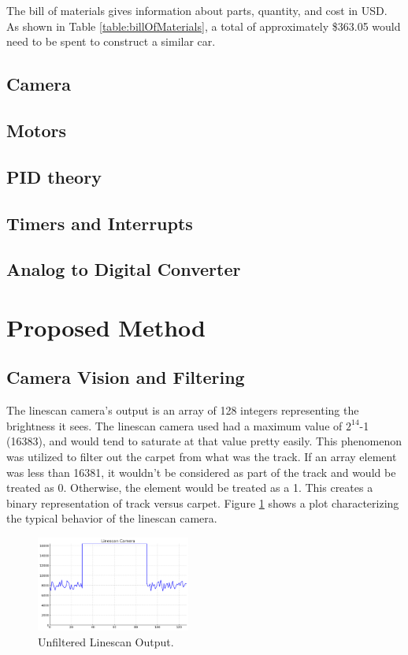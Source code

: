 \documentclass[conference]{IEEEtran}
\begin{document}
The bill of materials gives information about parts, quantity, and cost in USD. As shown in Table \ref{table:billOfMaterials}, a total of approximately \$363.05 would need to be spent to construct a similar car.

\subsection{Camera}

\subsection{Motors}

\subsection{PID theory}

\subsection{Timers and Interrupts}

\subsection{Analog to Digital Converter}

\section{Proposed Method}

\subsection{Camera Vision and Filtering}

The linescan camera's output is an array of 128 integers representing the brightness it sees. The linescan camera used had a maximum value of $2^{14}$-1 (16383), and would tend to saturate at that value pretty easily. This phenomenon was utilized to filter out the carpet from what was the track. If an array element was less than 16381, it wouldn't be considered as part of the track and would be treated as 0. Otherwise, the element would be treated as a 1. This creates a binary representation of track versus carpet. Figure \ref{fig:linescan} shows a plot characterizing the typical behavior of the linescan camera.

\begin{figure}[htbp]
	\centerline{\includegraphics[width=0.45\textwidth]{images/linescan.png}}
	\caption{Unfiltered Linescan Output.}
	\label{fig:linescan}
\end{figure}
\end{document}
